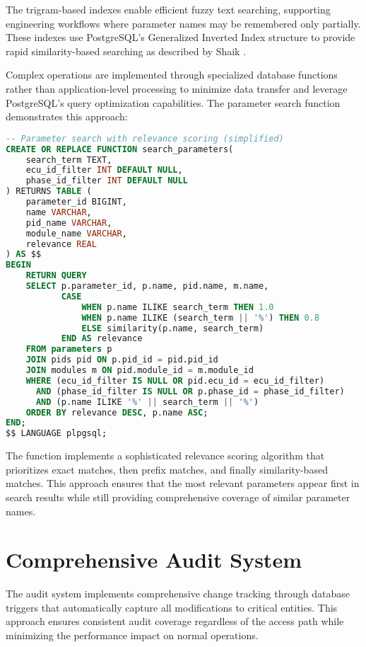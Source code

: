 The trigram-based indexes enable efficient fuzzy text searching, supporting engineering workflows where parameter names may be remembered only partially. These indexes use PostgreSQL's Generalized Inverted Index structure to provide rapid similarity-based searching as described by Shaik \cite{shaik2020postgresql}.

Complex operations are implemented through specialized database functions rather than application-level processing to minimize data transfer and leverage PostgreSQL's query optimization capabilities. The parameter search function demonstrates this approach:

\begin{lstlisting}[language=SQL, caption={Parameter Search Function}, label={lst:parameter-search}]
-- Parameter search with relevance scoring (simplified)
CREATE OR REPLACE FUNCTION search_parameters(
    search_term TEXT,
    ecu_id_filter INT DEFAULT NULL,
    phase_id_filter INT DEFAULT NULL
) RETURNS TABLE (
    parameter_id BIGINT,
    name VARCHAR,
    pid_name VARCHAR,
    module_name VARCHAR,
    relevance REAL
) AS $$
BEGIN
    RETURN QUERY
    SELECT p.parameter_id, p.name, pid.name, m.name,
           CASE 
               WHEN p.name ILIKE search_term THEN 1.0
               WHEN p.name ILIKE (search_term || '%') THEN 0.8
               ELSE similarity(p.name, search_term)
           END AS relevance
    FROM parameters p
    JOIN pids pid ON p.pid_id = pid.pid_id
    JOIN modules m ON pid.module_id = m.module_id
    WHERE (ecu_id_filter IS NULL OR pid.ecu_id = ecu_id_filter)
      AND (phase_id_filter IS NULL OR p.phase_id = phase_id_filter)
      AND (p.name ILIKE '%' || search_term || '%')
    ORDER BY relevance DESC, p.name ASC;
END;
$$ LANGUAGE plpgsql;
\end{lstlisting}

The function implements a sophisticated relevance scoring algorithm that prioritizes exact matches, then prefix matches, and finally similarity-based matches. This approach ensures that the most relevant parameters appear first in search results while still providing comprehensive coverage of similar parameter names.

\section{Comprehensive Audit System}
\label{sec:audit-system}

The audit system implements comprehensive change tracking through database triggers that automatically capture all modifications to critical entities. This approach ensures consistent audit coverage regardless of the access path while minimizing the performance impact on normal operations.

